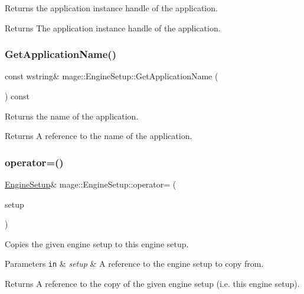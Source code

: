 Returns the application instance handle of the application.

\begin{DoxyReturn}{Returns}
The application instance handle of the application. 
\end{DoxyReturn}
\hypertarget{structmage_1_1_engine_setup_a63fed5e978c020ebc9d5080fe6fcefdc}{}\label{structmage_1_1_engine_setup_a63fed5e978c020ebc9d5080fe6fcefdc} 
\subsubsection{\texorpdfstring{Get\+Application\+Name()}{GetApplicationName()}}
{\footnotesize\ttfamily const wstring\& mage\+::\+Engine\+Setup\+::\+Get\+Application\+Name (\begin{DoxyParamCaption}{ }\end{DoxyParamCaption}) const}

Returns the name of the application.

\begin{DoxyReturn}{Returns}
A reference to the name of the application. 
\end{DoxyReturn}
\hypertarget{structmage_1_1_engine_setup_ad7066882519b59ca533293f743334508}{}\label{structmage_1_1_engine_setup_ad7066882519b59ca533293f743334508} 
\subsubsection{\texorpdfstring{operator=()}{operator=()}\hspace{0.1cm}{\footnotesize\ttfamily [1/2]}}
{\footnotesize\ttfamily \hyperlink{structmage_1_1_engine_setup}{Engine\+Setup}\& mage\+::\+Engine\+Setup\+::operator= (\begin{DoxyParamCaption}\item[{const \hyperlink{structmage_1_1_engine_setup}{Engine\+Setup} \&}]{setup }\end{DoxyParamCaption})\hspace{0.3cm}{\ttfamily [delete]}}

Copies the given engine setup to this engine setup.


\begin{DoxyParams}[1]{Parameters}
\mbox{\tt in}  & {\em setup} & A reference to the engine setup to copy from. \\
\hline
\end{DoxyParams}
\begin{DoxyReturn}{Returns}
A reference to the copy of the given engine setup (i.\+e. this engine setup). 
\end{DoxyReturn}
\hypertarget{structmage_1_1_engine_setup_a9ca25ff88af30786022964916790a497}{}\label{structmage_1_1_engine_setup_a9ca25ff88af30786022964916790a497} 
